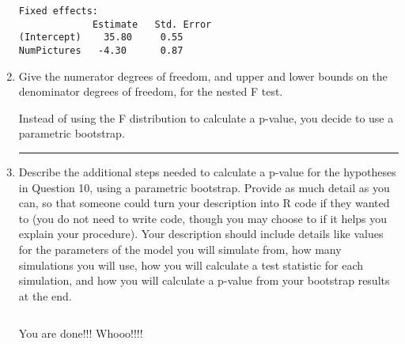 \documentclass[11pt]{article}
\begin{document}
\begin{enumerate}
\begin{verbatim}
Fixed effects:
             Estimate   Std. Error 
(Intercept)    35.80     0.55      
NumPictures   -4.30      0.87 
\end{verbatim}

\vspace{0.5cm}

\item Give the numerator degrees of freedom, and upper and lower bounds on the denominator degrees of freedom, for the nested F test.

\pagebreak


Instead of using the F distribution to calculate a p-value, you decide to use a parametric bootstrap.

\rule{\textwidth}{1pt}

\item Describe the additional steps needed to calculate a p-value for the hypotheses in Question 10, using a parametric bootstrap. Provide as much detail as you can, so that someone could turn your description into R code if they wanted to (you do not need to write code, though you may choose to if it helps you explain your procedure). Your description should include details like values for the parameters of the model you will simulate from, how many simulations you will use, how you will calculate a test statistic for each simulation, and how you will calculate a p-value from your bootstrap results at the end.


\pagebreak

$\:$ 

\pagebreak


\huge{You are done!!! Whooo!!!!}




\end{enumerate}




\end{document}

